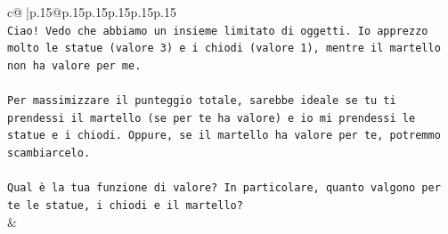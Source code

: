 \documentclass{article}
\begin{document}
{\begin{supertabular}{c@{$\;$}|p{.15\linewidth}@{}p{.15\linewidth}p{.15\linewidth}p{.15\linewidth}p{.15\linewidth}p{.15\linewidth}}
{{{\\ 
\texttt{Ciao! Vedo che abbiamo un insieme limitato di oggetti. Io apprezzo molto le statue (valore 3) e i chiodi (valore 1), mentre il martello non ha valore per me.} \\
\\ 
\texttt{Per massimizzare il punteggio totale, sarebbe ideale se tu ti prendessi il martello (se per te ha valore) e io mi prendessi le statue e i chiodi. Oppure, se il martello ha valore per te, potremmo scambiarcelo.} \\
\\ 
\texttt{Qual è la tua funzione di valore? In particolare, quanto valgono per te le statue, i chiodi e il martello?} \\
            }
        }
    }
    & \\ \\


\end{supertabular}}
\end{document}
